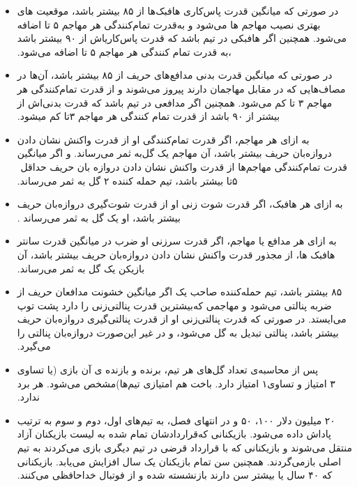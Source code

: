 \documentclass[]{article}
\begin{document}
\begin{itemize}
	\item
	‫ در ﺻﻮرﺗﯽ ﮐﻪ ﻣﯿﺎﻧﮕﯿﻦ ﻗﺪرت ﭘﺎسﮐﺎری ﻫﺎﻓﺒﮏﻫﺎ از ‪ ۸۵‬ﺑﯿﺸﺘﺮ ﺑﺎﺷﺪ‪ ،‬ﻣﻮﻗﻌﯿﺖ ﻫﺎی ﺑﻬﺘﺮی ﻧﺼﯿﺐ ﻣﻬﺎﺟﻢ ﻫﺎ ﻣﯽﺷﻮد و ﺑﻪ‬‫ﻗﺪرت ﺗﻤﺎمﮐﻨﻨﺪﮔﯽ ﻫﺮ ﻣﻬﺎﺟﻢ ‪ ۵‬ﺗﺎ اﺿﺎﻓﻪ ﻣﯽﺷﻮد‪ .‬ﻫﻤﭽﻨﯿﻦ اﮔﺮ ﻫﺎﻓﺒﮑﯽ در ﺗﯿﻢ ﺑﺎﺷﺪ ﮐﻪ ﻗﺪرت ﭘﺎسﮐﺎریاش از ‪ ۹۰‬ﺑﯿﺸﺘﺮ‬
	‫ﺑﺎﺷﺪ‪ ،‬ﺑﻪ ﻗﺪرت ﺗﻤﺎم ﮐﻨﻨﺪﮔﯽ ﻫﺮ ﻣﻬﺎﺟﻢ ‪ ۵‬ﺗﺎ اﺿﺎﻓﻪ ﻣﯽﺷﻮد‪.‬‬
	\item
	 ‫ در ﺻﻮرﺗﯽ ﮐﻪ ﻣﯿﺎﻧﮕﯿﻦ ﻗﺪرت ﺑﺪﻧﯽ ﻣﺪاﻓﻊﻫﺎی ﺣﺮﯾﻒ از ‪ ۸۵‬ﺑﯿﺸﺘﺮ ﺑﺎﺷﺪ‪ ،‬آنﻫﺎ در ﻣﺼﺎفﻫﺎﯾﯽ ﮐﻪ در ﻣﻘﺎﺑﻞ ﻣﻬﺎﺟﻤﺎن دارﻧﺪ ‬‫ﭘﯿﺮوز ﻣﯽﺷﻮﻧﺪ و از ﻗﺪرت ﺗﻤﺎمﮐﻨﻨﺪﮔﯽ ﻫﺮ ﻣﻬﺎﺟﻢ ‪ ۳‬ﺗﺎ ﮐﻢ ﻣﯽﺷﻮد‪ .‬ﻫﻤﭽﻨﯿﻦ اﮔﺮ ﻣﺪاﻓﻌﯽ در ﺗﯿﻢ ﺑﺎﺷﺪ ﮐﻪ ﻗﺪرت ﺑﺪﻧﯽاش از بیشتر از ۹۰ باشد از قدرت تمام کنندگی هر مهاجم ۳تا کم میشود.‬‬
	\item
	‫ ﺑﻪ ازای ﻫﺮ ﻣﻬﺎﺟﻢ‪ ،‬اﮔﺮ ﻗﺪرت ﺗﻤﺎمﮐﻨﻨﺪﮔﯽ او از ﻗﺪرت واﮐﻨﺶ ﻧﺸﺎن دادن دروازهﺑﺎن ﺣﺮﯾﻒ ﺑﯿﺸﺘﺮ ﺑﺎﺷﺪ‪ ،‬آن ﻣﻬﺎﺟﻢ ﯾﮏ ﮔﻞ‬‫ﺑﻪ ﺛﻤﺮ ﻣﯽرﺳﺎﻧﺪ‪ .‬و اﮔﺮ ﻣﯿﺎﻧﮕﯿﻦ ﻗﺪرت ﺗﻤﺎمﮐﻨﻨﺪﮔﯽ ﻣﻬﺎﺟﻢﻫﺎ از ﻗﺪرت واﮐﻨﺶ ﻧﺸﺎن دادن دروازه ﺑﺎن ﺣﺮﯾﻒ ﺣﺪاﻗﻞ ‪ ۵‬ﺗﺎ ﺑﯿﺸﺘﺮ ﺑﺎﺷﺪ‪ ،‬ﺗﯿﻢ ﺣﻤﻠﻪ ﮐﻨﻨﺪه ‪ ۲‬ﮔﻞ ﺑﻪ ﺛﻤﺮ ﻣﯽرﺳﺎﻧﺪ‪.
	\item
	‫ ﺑﻪ ازای ﻫﺮ ﻫﺎﻓﺒﮏ‪ ،‬اﮔﺮ ﻗﺪرت ﺷﻮت زﻧﯽ او از ﻗﺪرت ﺷﻮتﮔﯿﺮی دروازهﺑﺎن ﺣﺮﯾﻒ ﺑﯿﺸﺘﺮ ﺑﺎﺷﺪ‪ ،‬او ﯾﮏ ﮔﻞ ﺑﻪ ﺛﻤﺮ ﻣﯽرﺳﺎﻧﺪ ‪.‬‬‫ 
	\item
	ﺑﻪ ازای ﻫﺮ ﻣﺪاﻓﻊ ﯾﺎ ﻣﻬﺎﺟﻢ‪ ،‬اﮔﺮ ﻗﺪرت ﺳﺮزﻧﯽ او ﺿﺮب در ﻣﯿﺎﻧﮕﯿﻦ ﻗﺪرت ﺳﺎﻧﺘﺮ ﻫﺎﻓﺒﮏ ﻫﺎ‪ ،‬از ﻣﺠﺬور ﻗﺪرت واﮐﻨﺶ ﻧﺸﺎن‬‫ دادن دروازهﺑﺎن ﺣﺮﯾﻒ ﺑﯿﺸﺘﺮ ﺑﺎﺷﺪ‪ ،‬آن ﺑﺎزﯾﮑﻦ ﯾﮏ ﮔﻞ ﺑﻪ ﺛﻤﺮ ﻣﯽرﺳﺎﻧﺪ‪.‬‬
	\item
	اﮔﺮ ﻣﯿﺎﻧﮕﯿﻦ ﺧﺸﻮﻧﺖ ﻣﺪاﻓﻌﺎن ﺣﺮﯾﻒ از ‪ ۸۵‬ﺑﯿﺸﺘﺮ ﺑﺎﺷﺪ‪ ،‬ﺗﯿﻢ ﺣﻤﻠﻪﮐﻨﻨﺪه ﺻﺎﺣﺐ ﯾﮏ ﺿﺮﺑﻪ ﭘﻨﺎﻟﺘﯽ ﻣﯽﺷﻮد و ﻣﻬﺎﺟﻤﯽ ﮐﻪ‬‫ﺑﯿﺸﺘﺮﯾﻦ ﻗﺪرت ﭘﻨﺎﻟﺘﯽزﻧﯽ را دارد ﭘﺸﺖ ﺗﻮپ ﻣﯽاﯾﺴﺘﺪ‪ .‬در ﺻﻮرﺗﯽ ﮐﻪ ﻗﺪرت ﭘﻨﺎﻟﺘﯽزﻧﯽ او از ﻗﺪرت ﭘﻨﺎﻟﺘﯽﮔﯿﺮی دروازهﺑﺎن ‫ﺣﺮﯾﻒ ﺑﯿﺸﺘﺮ ﺑﺎﺷﺪ‪ ،‬ﭘﻨﺎﻟﺘﯽ ﺗﺒﺪﯾﻞ ﺑﻪ ﮔﻞ ﻣﯽﺷﻮد‪ ،‬و در ﻏﯿﺮ اﯾﻦﺻﻮرت دروازهﺑﺎن ﭘﻨﺎﻟﺘﯽ را ﻣﯽﮔﯿﺮد.
	\item
ﭘﺲ از ﻣﺤﺎﺳﺒﻪی ﺗﻌﺪاد ﮔﻞﻫﺎی ﻫﺮ ﺗﯿﻢ‪ ،‬ﺑﺮﻧﺪه و ﺑﺎزﻧﺪه ی آن ﺑﺎزی (ﯾﺎ ﺗﺴﺎوی ﺗﯿﻢﻫﺎ)ﻣﺸﺨﺺ ﻣﯽﺷﻮد‪ .‬ﻫﺮ ﺑﺮد ‪ ۳‬اﻣﺘﯿﺎز و ﺗﺴﺎوی‬‫‪ ۱‬اﻣﺘﯿﺎز دارد‪ .‬ﺑﺎﺧﺖ ﻫﻢ اﻣﺘﯿﺎزی ﻧﺪارد‪.‬‬
	\item
در اﻧﺘﻬﺎی ﻓﺼﻞ‪ ،‬ﺑﻪ ﺗﯿﻢﻫﺎی اول‪ ،‬دوم و ﺳﻮم ﺑﻪ ﺗﺮﺗﯿﺐ ‪ ۵۰ ،۱۰۰‬و ‪ ۲۰‬ﻣﯿﻠﯿﻮن دﻻر ﭘﺎداش داده ﻣﯽﺷﻮد‪ .‬ﺑﺎزﯾﮑﻨﺎﻧﯽ ﮐﻪ‬‫ﻗﺮاردادﺷﺎن ﺗﻤﺎم ﺷﺪه ﺑﻪ ﻟﯿﺴﺖ ﺑﺎزﯾﮑﻨﺎن آزاد ﻣﻨﺘﻘﻞ ﻣﯽﺷﻮﻧﺪ و ﺑﺎزﯾﮑﻨﺎﻧﯽ ﮐﻪ ﺑﺎ ﻗﺮارداد ﻗﺮﺿﯽ در ﺗﯿﻢ دﯾﮕﺮی ﺑﺎزی ﻣﯽﮐﺮدﻧﺪ ‫ﺑﻪ ﺗﯿﻢ اﺻﻠﯽ ﺑﺎزﻣﯽﮔﺮدﻧﺪ‪ .‬ﻫﻤﭽﻨﯿﻦ ﺳﻦ ﺗﻤﺎم ﺑﺎزﯾﮑﻨﺎن ﯾﮏ ﺳﺎل اﻓﺰاﯾﺶ ﻣﯽﯾﺎﺑﺪ‪ .‬ﺑﺎزﯾﮑﻨﺎﻧﯽ ﮐﻪ ‪ ۴۰‬ﺳﺎل ﯾﺎ ﺑﯿﺸﺘﺮ ﺳﻦ دارﻧﺪ ‫ﺑﺎزﻧﺸﺴﺘﻪ ﺷﺪه و از ﻓﻮﺗﺒﺎل ﺧﺪاﺣﺎﻓﻈﯽ ﻣﯽﮐﻨﻨﺪ‪.‬‬\\\\
	
\end{itemize}
\end{document}

